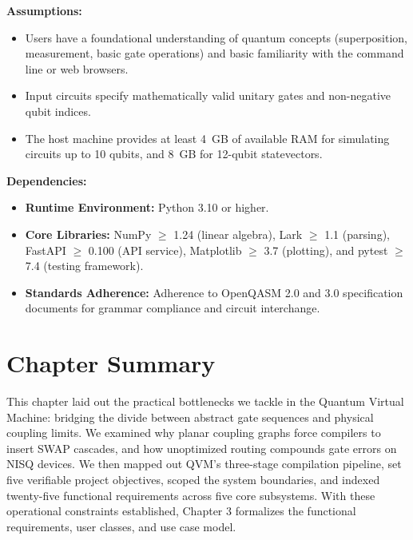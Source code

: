\textbf{Assumptions:}
\begin{itemize}[leftmargin=*]
    \item Users have a foundational understanding of quantum concepts (superposition, measurement, basic gate operations) and basic familiarity with the command line or web browsers.
    \item Input circuits specify mathematically valid unitary gates and non-negative qubit indices.
    \item The host machine provides at least 4~GB of available RAM for simulating circuits up to 10 qubits, and 8~GB for 12-qubit statevectors.
\end{itemize}

\textbf{Dependencies:}
\begin{itemize}[leftmargin=*]
    \item \textbf{Runtime Environment:} Python 3.10 or higher.
    \item \textbf{Core Libraries:} NumPy $\ge$ 1.24 (linear algebra), Lark $\ge$ 1.1 (parsing), FastAPI $\ge$ 0.100 (API service), Matplotlib $\ge$ 3.7 (plotting), and pytest $\ge$ 7.4 (testing framework).
    \item \textbf{Standards Adherence:} Adherence to OpenQASM 2.0 and 3.0 specification documents for grammar compliance and circuit interchange.
\end{itemize}


\section{Chapter Summary}

This chapter laid out the practical bottlenecks we tackle in the Quantum Virtual Machine: bridging the divide between abstract gate sequences and physical coupling limits. We examined why planar coupling graphs force compilers to insert SWAP cascades, and how unoptimized routing compounds gate errors on NISQ devices. We then mapped out QVM's three-stage compilation pipeline, set five verifiable project objectives, scoped the system boundaries, and indexed twenty-five functional requirements across five core subsystems. With these operational constraints established, Chapter 3 formalizes the functional requirements, user classes, and use case model.
